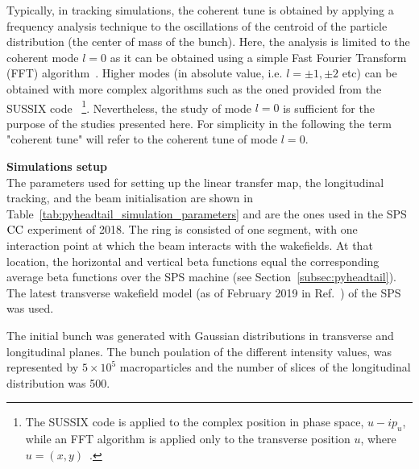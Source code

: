 Typically, in tracking simulations, the coherent tune is obtained by applying a frequency analysis technique to the oscillations of the centroid of the particle distribution (the center of mass of the bunch). Here, the analysis is limited to the coherent mode $l=0$ as it can be obtained using a simple Fast Fourier Transform (FFT) algorithm~\cite{FFT_and_applications}. Higher modes (in absolute value, i.e. $l=\pm 1, \pm 2$ etc) can be obtained with more complex algorithms such as the oned provided from the SUSSIX code~\cite{Bartolini:702438} \footnote{The SUSSIX code is applied to the complex position in phase space, $u-i p_u$, while an FFT algorithm is applied only to the transverse position $u$, where $u=(x,y)$~\cite{Salvant:1274254}.}. Nevertheless, the study of mode $l=0$ is sufficient for the purpose of the studies presented here. For simplicity in the following the term "coherent tune" will refer to the coherent tune of mode $l=0$.

\textbf{Simulations setup}\\
The parameters used for setting up the linear transfer map, the longitudinal tracking, and the beam initialisation are shown in Table~\ref{tab:pyheadtail_simulation_parameters} and are the ones used in the SPS ${\mathrm{CC}}$ experiment of 2018. The ring is consisted of one segment, with one interaction point at which the beam interacts with the wakefields. At that location, the horizontal and vertical beta functions equal the corresponding average beta functions over the SPS machine (see Section~\ref{subsec:pyheadtail}). The latest transverse wakefield model (as of February 2019 in Ref.~\cite{sps_impedance_model_git}) of the SPS was used.

The initial bunch was generated with Gaussian distributions in transverse and longitudinal planes. The bunch poulation of the different intensity values, was represented by $5 \times 10^5$ macroparticles and the number of slices of the longitudinal distribution was 500.

